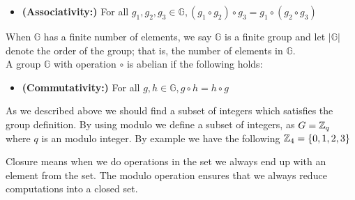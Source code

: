\begin{defi}
\begin{itemize}
\item \textnormal{\textbf{(Associativity:)}} For all \begin{math}g_1, g_2, g_3 \in \mathbb{G}, (g_1 \circ g_2) \circ g_3 = g_1 \circ( g_2 \circ g_3) \end{math}
\end{itemize}
When \begin{math}\mathbb{G}\end{math} has a finite number of elements, we say \begin{math}\mathbb{G}\end{math} is a finite group and let
\begin{math}| \mathbb{G}|\end{math} denote the order of the group; that is, the number of elements in \begin{math}\mathbb{G}\end{math}. \\
A group \begin{math}\mathbb{G}\end{math} with operation \begin{math}\circ\end{math} is abelian if the following holds:
\begin{itemize}
\item \textnormal{\textbf{(Commutativity:)}} For all \begin{math}g, h \in \mathbb{G}, g \circ h = h \circ g \end{math}
\end{itemize}
\end{defi}

\noindent
As we described above we should find a subset of integers which satisfies the group definition. By using modulo we define a subset of integers, as $G= \mathbb{Z}_q $ where $q$ is an modulo integer. By example we have the following \begin{math} \mathbb{Z}_4 = \{0,1,2,3\}\end{math}   


 Closure means when we do operations in the set we always end up with an element from the set. The modulo operation ensures that we always reduce computations into a closed set.


